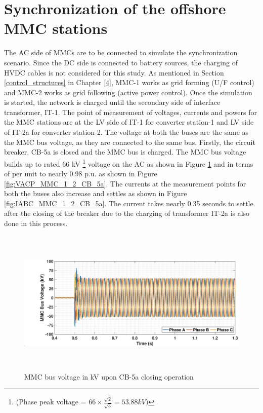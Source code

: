 \section{Synchronization of the offshore MMC stations}
The \gls{AC} side of \gls{MMC}s are to be connected to simulate the synchronization scenario. Since the \gls{DC} side is connected to battery sources, the charging of \gls{HVDC} cables is not considered for this study. As mentioned in Section \ref{control_structures} in Chapter \ref{4}, \gls{MMC}-1 works as grid forming (U/F control) and \gls{MMC}-2 works as grid following (active power control). Once the simulation is started, the network is charged until the secondary side of interface transformer, IT-1. The point of measurement of voltages, currents and powers for the \gls{MMC} stations are at the \gls{LV} side of IT-1 for converter station-1 and \gls{LV} side of IT-2a for converter station-2. The voltage at both the buses are the same as the \gls{MMC} bus voltage, as they are connected to the same bus. Firstly, the circuit breaker, CB-5a is closed and the \gls{MMC} bus is charged. The \gls{MMC} bus voltage builds up to rated 66 kV \footnote{(Phase peak voltage = $66\times \frac{\sqrt{2}}{\sqrt{3}} = 53.88 kV)$} voltage on the \gls{AC} as shown in Figure \ref{fig:VABC_MMC_1_2_CB_5a} and in terms of per unit to nearly 0.98 p.u. as shown in Figure \ref{fig:VACP_MMC_1_2_CB_5a}. The currents at the measurement points for both the buses also increase and settles as shown in Figure \ref{fig:IABC_MMC_1_2_CB_5a}. The current takes nearly 0.35 seconds to settle after the closing of the breaker due to the charging of transformer IT-2a is also done in this process. 

\begin{figure}[H]
\hspace*{-1.2cm}
    \includegraphics[height = 7cm,width = 18.5cm]{Diagrams/Chapter_5/VABC_MMC_1_2_CB_5a.eps}
    \caption{MMC bus voltage in kV upon CB-5a closing operation}
    \label{fig:VABC_MMC_1_2_CB_5a}
\end{figure}

